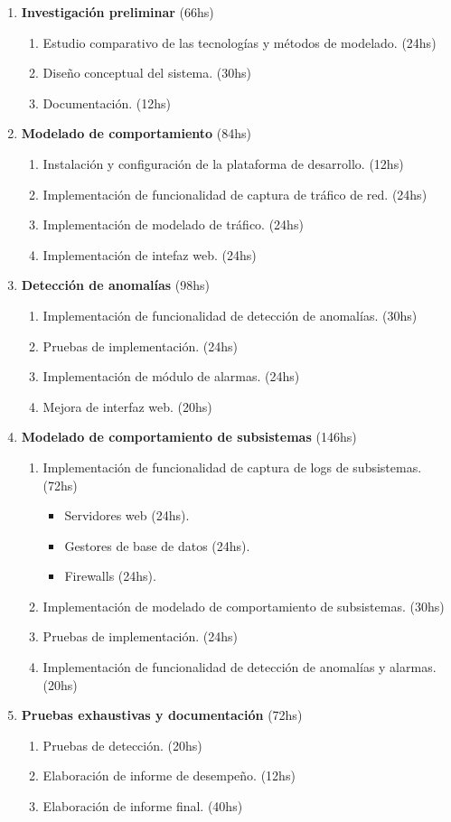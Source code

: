 \begin{enumerate}
	\setlength{\itemsep}{0pt}
	\setlength{\parskip}{0pt}
	\item \textbf{Investigación preliminar} (66hs)
	\begin{enumerate}
		\item Estudio comparativo de las tecnologías y métodos de modelado. (24hs)
		\item Diseño conceptual del sistema. (30hs)
		\item Documentación. (12hs)
	\end{enumerate}
	\item \textbf{Modelado de comportamiento} (84hs)
	\begin{enumerate}
		\item Instalación y configuración de la plataforma de desarrollo. (12hs)
		\item Implementación de funcionalidad de captura de tráfico de red. (24hs)
		\item Implementación de modelado de tráfico. (24hs)
		\item Implementación de intefaz web. (24hs)
	\end{enumerate}
	\item \textbf{Detección de anomalías} (98hs)
	\begin{enumerate}
		\item Implementación de funcionalidad de detección de anomalías. (30hs)
		\item Pruebas de implementación. (24hs)
		\item Implementación de módulo de alarmas. (24hs)
		\item Mejora de interfaz web. (20hs)
	\end{enumerate}
	\newpage
	\item \textbf{Modelado de comportamiento de subsistemas} (146hs)
	\begin{enumerate}
		\item Implementación de funcionalidad de captura de logs de subsistemas. (72hs)
		\begin{itemize}
			\item Servidores web (24hs).
			\item Gestores de base de datos (24hs).
			\item Firewalls (24hs).
		\end{itemize}
		\item Implementación de modelado de comportamiento de subsistemas. (30hs)
		\item Pruebas de implementación. (24hs)
		\item Implementación de funcionalidad de detección de anomalías y alarmas. (20hs)
	\end{enumerate}
	\item \textbf{Pruebas exhaustivas y documentación} (72hs)
	\begin{enumerate}
		\item Pruebas de detección. (20hs)
		\item Elaboración de informe de desempeño. (12hs)
		\item Elaboración de informe final. (40hs)
	\end{enumerate}
\end{enumerate}

